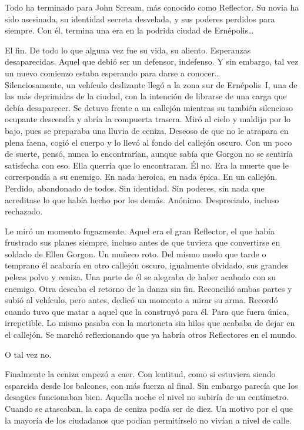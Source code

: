 \begin{prev}
    Todo ha terminado para John Scream, más conocido como Reflector. Su novia ha sido asesinada, su identidad secreta desvelada, y sus poderes perdidos para siempre. Con él, termina una era en la podrida ciudad de Ernépolis\dots
\end{prev}

\noindent{}El fin. De todo lo que alguna vez fue su vida, su aliento. Esperanzas desaparecidas. Aquel que debió ser un defensor, indefenso. Y sin embargo, tal vez un nuevo comienzo estaba esperando para darse a conocer\dots\\

\noindent{}Silenciosamente, un vehículo deslizante llegó a la zona sur de Ernépolis~I, una de las más deprimidas de la ciudad, con la intención de librarse de una carga que debía desaparecer. Se detuvo frente a un callejón mientras su también silencioso ocupante descendía y abría la compuerta trasera. Miró al cielo y maldijo por lo bajo, pues se preparaba una lluvia de ceniza. Deseoso de que no le atrapara en plena faena, cogió el cuerpo y lo llevó al fondo del callejón oscuro. Con un poco de suerte, pensó, nunca lo encontrarían, aunque sabía que Gorgon no se sentiría satisfecha con eso. Ella querría que lo encontraran. Él no. Era la muerte que le correspondía a su enemigo. En nada heroica, en nada épica. En un callejón. Perdido, abandonado de todos. Sin identidad. Sin poderes, sin nada que acreditase lo que había hecho por los demás. Anónimo. Despreciado, incluso rechazado.

Le miró un momento fugazmente. Aquel era el gran Reflector, el que había frustrado sus planes siempre, incluso antes de que tuviera que convertirse en soldado de Ellen Gorgon. Un muñeco roto. Del mismo modo que tarde o temprano él acabaría en otro callejón oscuro, igualmente olvidado, sus grandes peleas polvo y ceniza. Una parte de él se alegraba de haber acabado con su enemigo. Otra deseaba el retorno de la danza sin fin. Reconcilió ambas partes y subió al vehículo, pero antes, dedicó un momento a mirar su arma. Recordó cuando tuvo que matar a aquel que la construyó para él. Para que fuera única, irrepetible. Lo mismo pasaba con la marioneta sin hilos que acababa de dejar en el callejón. Se marchó reflexionando que ya habría otros Reflectores en el mundo.

O tal vez no.

Finalmente la ceniza empezó a caer. Con lentitud, como si estuviera siendo esparcida desde los balcones, con más fuerza al final. Sin embargo parecía que los desagües funcionaban bien. Aquella noche el nivel no subiría de un centímetro. Cuando se atascaban, la capa de ceniza podía ser de diez. Un motivo por el que la mayoría de los ciudadanos que podían permitírselo no vivían a nivel de calle.

